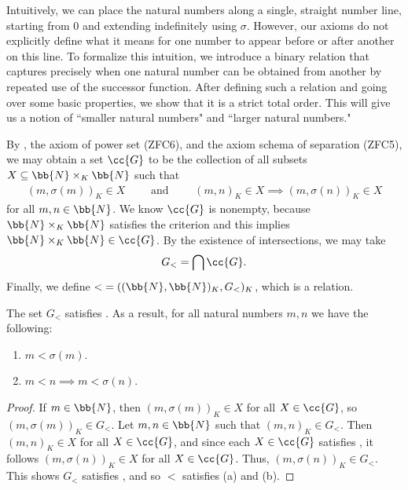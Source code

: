 Intuitively, we can place the natural numbers along a single, straight number line, starting from $0$ and extending indefinitely using $\sigma$. 
However, our axioms do not explicitly define what it means for one number to appear before or after another on this line.
To formalize this intuition, we introduce a binary relation that captures precisely when one natural number can be obtained from another by repeated use of the successor function. 
After defining such a relation and going over some basic properties, we show that it is a strict total order.
This will give us a notion of ``smaller natural numbers" and ``larger natural numbers."

By , the axiom of power set (ZFC6), and the axiom schema of separation (ZFC5), we may obtain a set $\cc{G}$ to be the collection of all subsets $X\subseteq \bb{N}\times_{K}\bb{N}$ such that
\begin{align}\label{ch1eqn_nat_order_rel}
	(m, \sigma(m))_{K}\in X \qquad\text{ and }\qquad (m, n)_{K}\in X\implies (m, \sigma(n))_{K}\in X
\end{align}
for all $m, n\in\bb{N}$. 
We know $\cc{G}$ is nonempty, because $\bb{N}\times_{K}\bb{N}$ satisfies the criterion  and this implies $\bb{N}\times_{K}\bb{N}\in\cc{G}$. 
By the existence of intersections, we may take 
\begin{align}\label{ch1eqn_nat_order_rel2}
	G_{<} = \bigcap\cc{G}.
\end{align}
Finally, we define $< \; = ((\bb{N}, \bb{N})_{K}, G_{<})_{K}$, which is a relation. 

\begin{lemma}\label{ch1thm_peano_order_basic0}
	The set $G_{<}$ satisfies . 
	As a result, for all natural numbers $m, n$ we have the following:
	\begin{enumerate}[itemsep=-0.4ex, label=\textup{(\alph*)}]
		\item $m < \sigma(m)$.
		\item $m < n \implies m < \sigma(n)$. 
	\end{enumerate}
\end{lemma}
\begin{proof}
	If $m\in\bb{N}$, then $(m, \sigma(m))_{K}\in X$ for all $X\in\cc{G}$, so $(m, \sigma(m))_{K}\in G_{<}$. 
	Let $m, n\in\bb{N}$ such that $(m, n)_{K}\in G_{<}$.
	Then $(m, n)_{K}\in X$ for all $X\in\cc{G}$, and since each $X\in\cc{G}$ satisfies , it follows $(m, \sigma(n))_{K}\in X$ for all $X\in\cc{G}$. 
	Thus, $(m, \sigma(n))_{K}\in G_{<}$. 
	This shows $G_{<}$ satisfies , and so $<$ satisfies (a) and (b). 
\end{proof}

